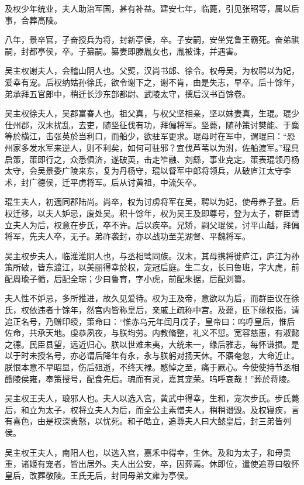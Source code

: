 \documentclass[12pt,UTF8]{ctexbook}
\begin{document}
及权少年统业，夫人助治军国，甚有补益。建安七年，临薨，引见张昭等，属以后事，合葬高陵。

八年，景卒官，子奋授兵为将，封新亭侯，卒。子安嗣，安坐党鲁王霸死。奋弟祺嗣，封都亭侯，卒。子纂嗣。纂妻即滕胤女也，胤被诛，并遇害。

吴主权谢夫人，会稽山阴人也。父煚，汉尚书郎、徐令。权母吴，为权聘以为妃，爱幸有宠。后权纳姑孙徐氏，欲令谢下之，谢不肯，由是失志，早卒。后十馀年，弟承拜五官郎中，稍迁长沙东部都尉、武陵太守，撰后汉书百馀卷。

吴主权徐夫人，吴郡富春人也。祖父真，与权父坚相亲，坚以妹妻真，生琨。琨少仕州郡，汉末扰乱，去吏，随坚征伐有功，拜偏将军。坚薨，随孙策讨樊能、于麋等於横江，击张英於当利口，而船少，欲驻军更求。琨母时在军中，谓琨曰：“恐州家多发水军来逆人，则不利矣，如何可驻邪？宜伐芦苇以为泭，佐船渡军。”琨具启策，策即行之，众悉俱济，遂破英，击走笮融、刘繇，事业克定。策表琨领丹杨太守，会吴景委广陵来东，复为丹杨守，琨以督军中郎将领兵，从破庐江太守李术，封广德侯，迁平虏将军。后从讨黄祖，中流矢卒。

琨生夫人，初適同郡陆尚。尚卒，权为讨虏将军在吴，聘以为妃，使母养子登。后权迁移，以夫人妒忌，废处吴。积十馀年，权为吴王及即尊号，登为太子，群臣请立夫人为后，权意在步氏，卒不许。后以疾卒。兄矫，嗣父琨侯，讨平山越，拜偏将军，先夫人卒，无子。弟祚袭封，亦以战功至芜湖督、平魏将军。

吴主权步夫人，临淮淮阴人也，与丞相骘同族。汉末，其母携将徙庐江，庐江为孙策所破，皆东渡江，以美丽得幸於权，宠冠后庭。生二女，长曰鲁班，字大虎，前配周瑜子循，后配全琮；少曰鲁育，字小虎，前配朱据，后配刘纂。

夫人性不妒忌，多所推进，故久见爱待。权为王及帝，意欲以为后，而群臣议在徐氏，权依违者十馀年，然宫内皆称皇后，亲戚上疏称中宫。及薨，臣下缘权指，请追正名号，乃赠印绶，策命曰：“惟赤乌元年闰月戊子，皇帝曰：呜呼皇后，惟后佐命，共承天地。虔恭夙夜，与朕均劳。内教脩整，礼义不愆。宽容慈惠，有淑懿之德。民臣县望，远近归心。朕以世难未夷，大统未一，缘后雅志，每怀谦损。是以于时未授名号，亦必谓后降年有永，永与朕躬对扬天休。不寤奄忽，大命近止。朕恨本意不早昭显，伤后殂逝，不终天禄。愍悼之至，痛于厥心。今使使持节丞相醴陵侯雍，奉策授号，配食先后。魂而有灵，嘉其宠荣。呜呼哀哉！”葬於蒋陵。

吴主权王夫人，琅邪人也。夫人以选入宫，黄武中得幸，生和，宠次步氏。步氏薨后，和立为太子，权将立夫人为后，而全公主素憎夫人，稍稍谮毁。及权寝疾，言有喜色，由是权深责怒，以忧死。和子皓立，追尊夫人曰大懿皇后，封三弟皆列侯。

吴主权王夫人，南阳人也，以选入宫，嘉禾中得幸，生休。及和为太子，和母贵重，诸姬有宠者，皆出居外。夫人出公安，卒，因葬焉。休即位，遣使追尊曰敬怀皇后，改葬敬陵。王氏无后，封同母弟文雍为亭侯。
\end{document}
